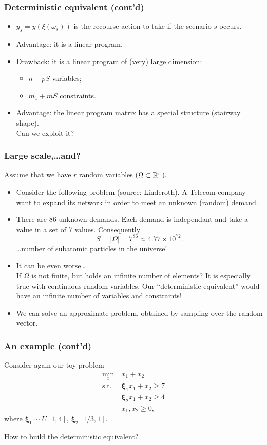 \documentclass{beamer}
\def\bxi{\boldsymbol\xi}
\def\bxi{\boldsymbol\xi}
\begin{document}
\begin{frame}
	\frametitle{Deterministic equivalent (cont'd)}
	
	\begin{itemize}
		\item
		$y_s = y(\xi(\omega_s))$ is the recourse action to take if the scenario
		$s$ occurs.
		\item
		Advantage: it is a linear program.
		\item
		Drawback: it is a linear program of (very) large dimension:
		\begin{itemize}
			\item
			$n+pS$ variables;
			\item
			$m_1+mS$ constraints.
		\end{itemize}
		\item
		Advantage: the linear program matrix has a special structure (stairway shape).\\
		Can we exploit it?
	\end{itemize}
	
\end{frame}

\begin{frame}
	\frametitle{Large scale,\ldots and?}
	
	Assume that we have $r$ random variables ($\Omega \subset
	{\mathbb{R}}^r$).
	\begin{itemize}
		\item
		Consider the following problem (source: Linderoth).
		A Telecom company want to expand its network in order to meet an unknown (random) demand.
		\item
		There are 86 unknown demands.
		Each demand is independant and take a value in a set of 7 values.
		Consequently
		\[
		S = |\Omega| = 7^{86} \approx 4.77\times10^{72}.
		\]
		\ldots number of subatomic particles in the universe!
		\item
		It can be even worse\ldots\\
		If $\Omega$ is not finite, but holds an infinite number of elements?
		It is especially true with continuous random variables.
		Our ``deterministic equivalent'' would have an infinite number of variables and constraints!
		\item
		We can solve an approximate problem, obtained by sampling over the random vector.
	\end{itemize}
\end{frame}

\begin{frame}
	\frametitle{An example (cont'd)}
	
	Consider again our toy problem
	\begin{align*}
	\min_x\ & x_1+x_2\\
	\mbox{s.t. } & \bxi_1x_1 + x_2 \geq 7 \\
	& \bxi_2x_1 + x_2 \geq 4 \\
	& x_1, x_2 \geq 0,
	\end{align*}
	where $\bxi_1 \sim U[1,4]$, $\bxi_2[1/3,1]$.
	
	\mbox{}
	
	How to build the deterministic equivalent?
	
\end{frame}
\end{document}

